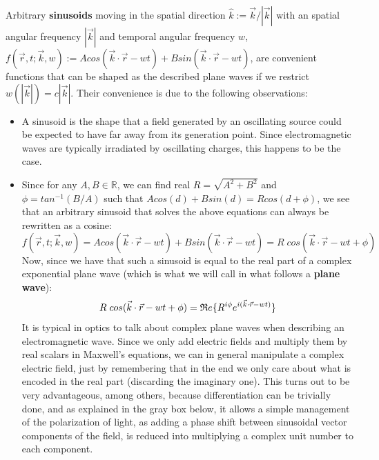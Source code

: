 \documentclass[11pt, a4paper, twoside]{article} %
\newcommand{\R}{\mathbb{R}} %
\begin{document}
Arbitrary {\bf sinusoids} moving in the spatial direction $\hat{k}:=\vec{k}/|\vec{k}|$ with an spatial angular frequency $|\vec{k}|$ and temporal angular frequency $w$, $f(\vec{r},t;\vec{k},w):=Acos(\vec{k}\cdot \vec{r}-wt)+Bsin(\vec{k}\cdot \vec{r}-wt)$, are convenient functions that can be shaped as the described plane waves if we restrict $w(|\vec{k}|)=c|\vec{k}|$. Their convenience is due to the following observations:\vspace{-0.2cm}
\begin{itemize}
\item A sinusoid is the shape that a field generated by an oscillating source could be expected to have far away from its generation point. Since electromagnetic waves are typically irradiated by oscillating charges, this happens to be the case.

\item Since for any $A,B\in\R$, we can find real $R=\sqrt{A^2+B^2}$ and $\phi=tan^{-1}(B/A)$ such that $Acos(d)+Bsin(d)=Rcos(d+\phi)$, we see that an arbitrary sinusoid that solves the above equations can always be rewritten as a cosine:
\begin{equation}
f(\vec{r},t;\vec{k},w)=Acos(\vec{k}\cdot \vec{r}-wt)+Bsin(\vec{k}\cdot \vec{r}-wt)=R\;cos(\vec{k}\cdot \vec{r}-wt+\phi)
\end{equation}
Now, since we have that such a sinusoid is equal to the real part of a complex exponential plane wave (which is what we will call in what follows a {\bf plane wave}):\vspace{-0.2cm}
\begin{equation}
R\;cos(\vec{k}\cdot \vec{r}-wt+\phi)=\mathfrak{R}e\{R^{i\phi}e^{i(\vec{k}\cdot \vec{r}-wt)}\}\vspace{-0.2cm}
\end{equation}
It is typical in optics to talk about complex plane waves when describing an electromagnetic wave. Since we only add electric fields and multiply them by real scalars in Maxwell's equations, we can in general manipulate a complex electric field, just by remembering that in the end we only care about what is encoded in the real part (discarding the imaginary one). This turns out to be very advantageous, among others, because differentiation can be trivially done, and as explained in the gray box below, it allows a simple management of the polarization of light, as adding a phase shift between sinusoidal vector components of the field, is reduced into multiplying a complex unit number to each component.


\end{itemize}
\end{document}
